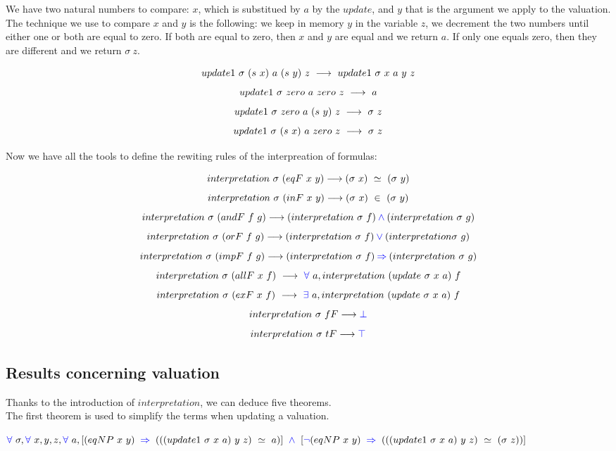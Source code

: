 \documentclass[a4paper]{article}
\begin{document}
We have two natural numbers to compare: $x$, which is substitued by $a$ by the $update$, and $y$ that is the argument we apply to the valuation. The technique we use to compare $x$ and $y$ is the following: we keep in memory $y$ in the variable $z$, we decrement the two numbers until either one or both are equal to zero. If both are equal to zero, then $x$ and $y$ are equal and we return $a$. If only one equals zero, then they are different and we return $\sigma \ z$.

$$update1 \ \sigma \ (s \ x) \ a \ (s \ y) \ z \ \longrightarrow \ update1 \ \sigma \ x \ a \ y \ z$$
$$ update1 \ \sigma \ zero \ a \ zero \ z \ \lra \ a$$
$$update1 \ \sigma \ zero \ a \ (s \ y) \ z \ \longrightarrow \ \sigma \ z$$
$$update1 \ \sigma \ (s \ x) \ a \ zero \ z \ \longrightarrow \ \sigma \ z$$


Now we have all the tools to define the rewiting rules of the interpreation of formulas:

$$interpretation \ \sigma \ (eqF \ x \ y) \longrightarrow (\sigma \ x) \ \simeq \ (\sigma \ y)$$
$$interpretation \ \sigma \ (inF \ x \ y) \longrightarrow (\sigma \ x) \ \in \ (\sigma \ y)$$
$$interpretation \ \sigma \ (andF \ f \ g) \lra (interpretation \ \sigma \ f) \conj (interpretation \ \sigma \ g)$$
$$interpretation \ \sigma \ (orF \ f \ g) \longrightarrow (interpretation \ \sigma \ f) \mathbin{\color{blue} \vee}  (interpretation \sigma \ g)$$
$$interpretation \ \sigma \ (impF \ f \ g) \lra (interpretation \ \sigma \ f) \imp (interpretation \ \sigma \ g)$$
$$interpretation \ \sigma \ (allF \ x \ f) \ \lra \ \fa \ a, interpretation \ (update \ \sigma \ x \ a) \ f$$
$$interpretation \ \sigma \ (exF \ x \ f) \ \lra \ \ex \ a, interpretation \ (update \ \sigma \ x \ a) \ f$$
$$interpretation \ \sigma \ fF \longrightarrow {\color{blue} \bot}$$
$$interpretation \ \sigma \ tF \longrightarrow {\color{blue} \top}$$


\subsection{Results concerning valuation}

Thanks to the introduction of $interpretation$, we can deduce five theorems. \\

The first theorem is used to simplify the terms when updating a valuation.

\begin{theorem}
$\fa \ \sigma, \fa \ x, y, z, \fa \ a, [(eqNP \ x \ y) \ \imp \ (((update1 \ \sigma \ x \ a) \ y \ z) \ \simeq \ a)] \ \conj \ [\blneg(eqNP \ x \ y) \ \imp \ (((update1 \ \sigma \ x \ a) \ y \ z) \ \simeq \ (\sigma \ z))]$
\end{theorem}
\end{document}
